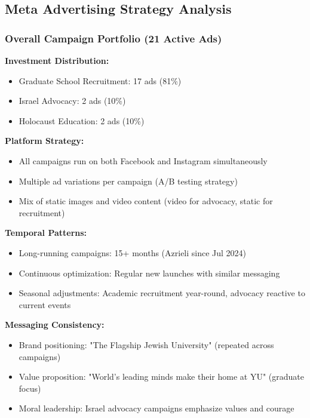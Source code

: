 \documentclass[12pt,letterpaper]{article}
\begin{document}
\subsection{Meta Advertising Strategy Analysis}

\subsubsection{Overall Campaign Portfolio (21 Active Ads)}

\textbf{Investment Distribution:}
\begin{itemize}[leftmargin=*]
    \item Graduate School Recruitment: 17 ads (81\%)
    \item Israel Advocacy: 2 ads (10\%)
    \item Holocaust Education: 2 ads (10\%)
\end{itemize}

\textbf{Platform Strategy:}
\begin{itemize}[leftmargin=*]
    \item All campaigns run on both Facebook and Instagram simultaneously
    \item Multiple ad variations per campaign (A/B testing strategy)
    \item Mix of static images and video content (video for advocacy, static for recruitment)
\end{itemize}

\textbf{Temporal Patterns:}
\begin{itemize}[leftmargin=*]
    \item Long-running campaigns: 15+ months (Azrieli since Jul 2024)
    \item Continuous optimization: Regular new launches with similar messaging
    \item Seasonal adjustments: Academic recruitment year-round, advocacy reactive to current events
\end{itemize}

\textbf{Messaging Consistency:}
\begin{itemize}[leftmargin=*]
    \item Brand positioning: "The Flagship Jewish University" (repeated across campaigns)
    \item Value proposition: "World's leading minds make their home at YU" (graduate focus)
    \item Moral leadership: Israel advocacy campaigns emphasize values and courage
\end{itemize}
\end{document}
